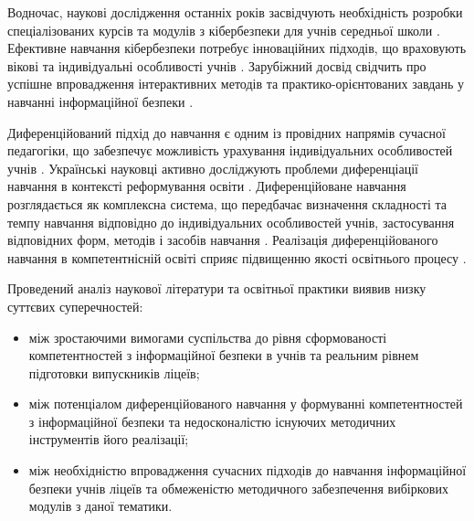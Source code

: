 Водночас, наукові дослідження останніх років засвідчують необхідність розробки спеціалізованих курсів та модулів з кібербезпеки для учнів середньої школи \cite{Jerman2024, Ismail2024}. Ефективне навчання кібербезпеки потребує інноваційних підходів, що враховують вікові та індивідуальні особливості учнів \cite{Jerman20259093}. Зарубіжний досвід свідчить про успішне впровадження інтерактивних методів та практико-орієнтованих завдань у навчанні інформаційної безпеки \cite{Antunes2021, Wang2020}.

Диференційований підхід до навчання є одним із провідних напрямів сучасної педагогіки, що забезпечує можливість урахування індивідуальних особливостей учнів \cite{Tomlinson2001}. Українські науковці активно досліджують проблеми диференціації навчання в контексті реформування освіти \cite{ШАРОВ2021, Шевчук_2020}. Диференційоване навчання розглядається як комплексна система, що передбачає визначення складності та темпу навчання відповідно до індивідуальних особливостей учнів, застосування відповідних форм, методів і засобів навчання \cite{Пісоцька2022}. Реалізація диференційованого навчання в компетентнісній освіті сприяє підвищенню якості освітнього процесу \cite{Білик2017}.

Проведений аналіз наукової літератури та освітньої практики виявив низку суттєвих суперечностей:
\begin{itemize}
    \item між зростаючими вимогами суспільства до рівня сформованості компетентностей з інформаційної безпеки в учнів та реальним рівнем підготовки випускників ліцеїв;
    \item між потенціалом диференційованого навчання у формуванні компетентностей з інформаційної безпеки та недосконалістю існуючих методичних інструментів його реалізації;
    \item між необхідністю впровадження сучасних підходів до навчання інформаційної безпеки учнів ліцеїв та обмеженістю методичного забезпечення вибіркових модулів з даної тематики.
\end{itemize}


